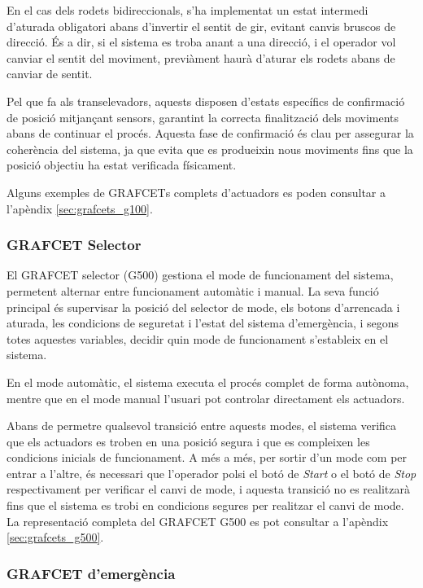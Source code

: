 \documentclass[a4paper,11pt,DIV=13,headings=normal,abstract=true,twoside=semi]{article}
\newcommand{\acro}[1]{\textsc{#1}}
\begin{document}
En el cas dels rodets bidireccionals, s'ha implementat un estat intermedi d'aturada obligatori abans d'invertir el sentit de gir, evitant canvis bruscos de direcció. És a dir, si el sistema es troba anant a una direcció, i el operador vol canviar el sentit del moviment, previàment haurà d'aturar els rodets abans de canviar de sentit. 

Pel que fa als transelevadors, aquests disposen d'estats específics de confirmació de posició mitjançant sensors, garantint la correcta finalització dels moviments abans de continuar el procés. Aquesta fase de confirmació és clau per assegurar la coherència del sistema, ja que evita que es produeixin nous moviments fins que la posició objectiu ha estat verificada físicament.

Alguns exemples de \acro{GRAFCET}s complets d'actuadors es poden consultar a l'apèndix \ref{sec:grafcets_g100}.


\subsubsection{\acro{GRAFCET} Selector}
\label{sec:section_selector}

El \acro{GRAFCET} selector (G500) gestiona el mode de funcionament del sistema, permetent alternar entre funcionament automàtic i manual. La seva funció principal és supervisar la posició del selector de mode, els botons d'arrencada i aturada, les condicions de seguretat i l'estat del sistema d'emergència, i segons totes aquestes variables, decidir quin mode de funcionament s'estableix en el sistema.

En el mode automàtic, el sistema executa el procés complet de forma autònoma, mentre que en el mode manual l'usuari pot controlar directament els actuadors.

Abans de permetre qualsevol transició entre aquests modes, el sistema verifica que els actuadors es troben en una posició segura i que es compleixen les condicions inicials de funcionament. A més a més, per sortir d'un mode com per entrar a l'altre, és necessari que l'operador polsi el botó de \emph{Start} o el botó de \emph{Stop} respectivament per verificar el canvi de mode, i aquesta transició no es realitzarà fins que el sistema es trobi en condicions segures per realitzar el canvi de mode. La representació completa del \acro{GRAFCET} G500 es pot consultar a l'apèndix \ref{sec:grafcets_g500}.

\subsubsection{\acro{GRAFCET} d'emergència}
\label{sec:grafc_emerg}
\end{document}
